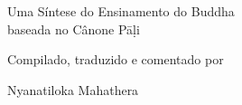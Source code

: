 \cleartorecto
\thispagestyle{empty}
\vspace*{5em}


{\centering

\settowidth{\titleLength}{%
  {\Large\chapterTitleFont\scshape\MakeLowercase{\thetitle}}%
}

{\Large\chapterTitleFont\scshape\MakeLowercase{\thetitle}}\\[0.3\baselineskip]
\raisebox{0.5\xheight}{\color[gray]{0.4}\rule{\titleLength}{0.25pt}}\\[0.3\baselineskip]

Uma Síntese do Ensinamento do Buddha\\
baseada no Cânone Pāḷi

\vfill

Compilado, traduzido e comentado por

Nyanatiloka Mahathera


\vspace*{5em}

}

